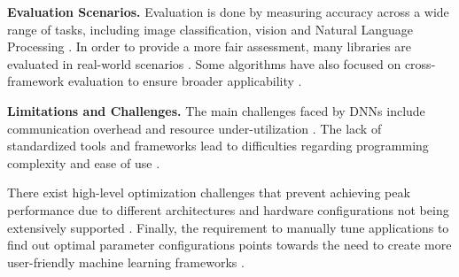 \textbf{Evaluation Scenarios.}
Evaluation is done by measuring accuracy across a wide range of tasks, including image classification,
vision and Natural Language Processing . In order to provide a more
fair assessment, many libraries are evaluated in real-world scenarios .
Some algorithms have also focused on cross-framework evaluation to ensure broader applicability
.

\textbf{Limitations and Challenges.}
The main challenges faced by DNNs include communication overhead and resource under-utilization
. The lack of standardized tools and frameworks lead
to difficulties regarding programming complexity and ease of use .

There exist high-level optimization challenges that prevent achieving peak performance due to
different architectures and hardware configurations not being extensively supported
. Finally, the requirement to manually tune applications to find out optimal
parameter configurations points towards the need to create more user-friendly machine learning
frameworks .


